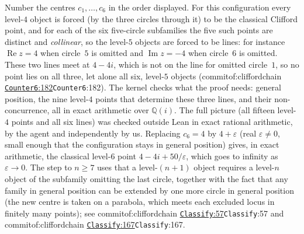 \documentclass[11pt]{article}
\theoremstyle{definition}
\theoremstyle{remark}
\newcommand{\commitof}[1]{\csname commitof:#1\endcsname}
\newcommand{\repo}[1]{https://github.com/jpbald93/#1}
\newcommand{\src}[4]{\ifcsname commitof:#1\endcsname
  \href{\repo{#1}/blob/\commitof{#1}/#2/#3.lean\#L#4}{\texttt{#3}:#4}\else\texttt{#3}:#4\fi}
\begin{document}
Number the centres $c_1,\dots,c_6$ in the order displayed. For this configuration every level-$4$
object is forced (by the three circles through it) to be the classical Clifford point, and for each
of the six five-circle subfamilies the five such points are distinct and \emph{collinear}, so the
level-$5$ objects are forced to be lines: for instance $\operatorname{Re}z=4$ when circle~$5$ is omitted
and $\operatorname{Im}z=-4$ when circle~$6$ is omitted. These two lines meet at $4-4i$, which is not on
the line for omitted circle~$1$, so no point lies on all three, let alone all six, level-$5$ objects
(\src{cliffordchain}{Clifford}{Counter6}{182}). The kernel checks what the proof needs: general position,
the nine level-$4$ points that determine these three lines, and their non-concurrence, all in exact
arithmetic over $\mathbb{Q}(i)$. The full picture (all fifteen level-$4$ points and all six lines) was
checked outside Lean in exact rational arithmetic, by the agent and independently by us. Replacing $c_6=4$ by $4+\varepsilon$ (real $\varepsilon\ne0$, small enough that the configuration stays in general position) gives, in exact arithmetic, the
classical level-$6$ point $4-4i+50/\varepsilon$, which goes to infinity as $\varepsilon\to0$. The step to $n\ge7$ uses that a level-$(n+1)$ object requires a level-$n$
object of the subfamily omitting the last circle, together with the fact that any family in general
position can be extended by one more circle in general position (the new centre is taken on a parabola,
which meets each excluded locus in finitely many points); see \src{cliffordchain}{Clifford}{Classify}{57}
and \src{cliffordchain}{Clifford}{Classify}{167}.
\end{document}
